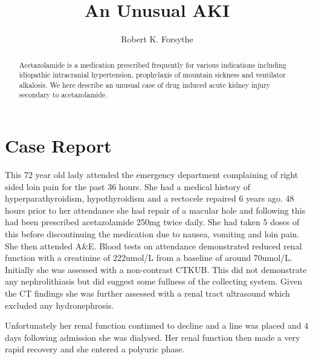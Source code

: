 \documentclass[11pt, ]{article}
\title{An Unusual AKI}
\author{Robert K. Forsythe}
\begin{document}
\maketitle
\begin{abstract}
	Acetazolamide is a medication prescribed frequently for various indications including idiopathic intracranial hypertension, prophylaxis of mountain sickness and ventilator alkalosis. We here describe an unusual case of drug induced acute kidney injury secondary to acetazolamide. 
\end{abstract}
		
\section*{Case Report}

This 72 year old lady attended the emergency department complaining of right sided loin pain for the past 36 hours. She had a medical history of hyperparathyroidism, hypothyroidism and a rectocele repaired 6 years ago. 48 hours prior to her attendance she had repair of a macular hole and following this had been prescribed acetazolamide 250mg twice daily. She had taken 5 doses of this before discontinuing the medication due to nausea, vomiting and loin pain. She then attended A\&E. Blood tests on attendance demonstrated reduced renal function with a creatinine of 222umol/L from a baseline of around 70umol/L. Initially she was assessed with a non-contrast CTKUB. This did not demonstrate any nephrolithiasis but did suggest some fullness of the collecting system. Given the CT findings she was further assessed with a renal tract ultrasound which excluded any hydronephrosis. 

Unfortunately her renal function continued to decline and a line was placed and 4 days following admission she was dialysed. Her renal function then made a very rapid recovery and she entered a polyuric phase. 
\end{document}
